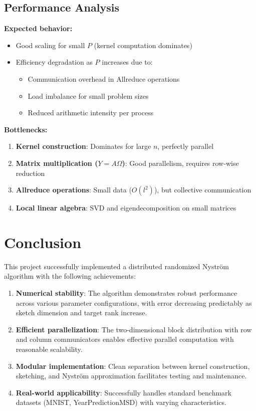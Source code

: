 \documentclass[11pt,a4paper]{article}
\begin{document}
\subsection{Performance Analysis}

\textbf{Expected behavior:}
\begin{itemize}
    \item Good scaling for small $P$ (kernel computation dominates)
    \item Efficiency degradation as $P$ increases due to:
    \begin{itemize}
        \item Communication overhead in Allreduce operations
        \item Load imbalance for small problem sizes
        \item Reduced arithmetic intensity per process
    \end{itemize}
\end{itemize}

\textbf{Bottlenecks:}
\begin{enumerate}
    \item \textbf{Kernel construction}: Dominates for large $n$, perfectly parallel
    \item \textbf{Matrix multiplication ($Y = A\Omega$)}: Good parallelism, requires row-wise reduction
    \item \textbf{Allreduce operations}: Small data ($O(l^2)$), but collective communication
    \item \textbf{Local linear algebra}: SVD and eigendecomposition on small matrices
\end{enumerate}

\section{Conclusion}

This project successfully implemented a distributed randomized Nyström algorithm with the following achievements:

\begin{enumerate}
    \item \textbf{Numerical stability}: The algorithm demonstrates robust performance across various parameter configurations, with error decreasing predictably as sketch dimension and target rank increase.
    
    \item \textbf{Efficient parallelization}: The two-dimensional block distribution with row and column communicators enables effective parallel computation with reasonable scalability.
    
    \item \textbf{Modular implementation}: Clean separation between kernel construction, sketching, and Nyström approximation facilitates testing and maintenance.
    
    \item \textbf{Real-world applicability}: Successfully handles standard benchmark datasets (MNIST, YearPredictionMSD) with varying characteristics.
\end{enumerate}
\end{document}
